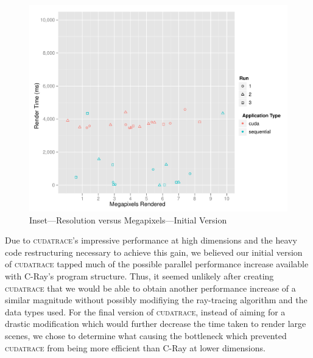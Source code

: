 \documentclass[12pt]{article}
\begin{document}
\begin{figure}
    \caption{Inset---Resolution versus Megapixels---Initial Version} \label{fig:inset_initial}
    \begin{center}
\includegraphics{cudatrace-004}
    \end{center}
\end{figure}

Due to \textsc{cudatrace}'s impressive performance at high dimensions and the heavy code restructuring necessary to achieve this gain, we believed our initial version of \textsc{cudatrace} tapped much of the possible parallel performance increase available with C-Ray's program structure. Thus, it seemed unlikely after creating \textsc{cudatrace} that we would be able to obtain another performance increase of a similar magnitude without possibly modifiying the ray-tracing algorithm and the data types used. For the final version of \textsc{cudatrace}, instead of aiming for a drastic modification which would further decrease the time taken to render large scenes, we chose to determine what causing the bottleneck which prevented \textsc{cudatrace} from being more efficient than C-Ray at lower dimensions.
\end{document}
